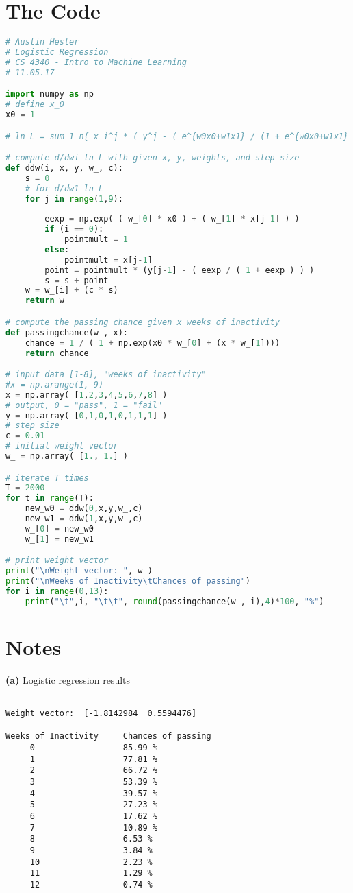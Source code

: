 \documentclass{article}
\begin{document}
\section*{The Code}
\lstset{
	frame=tb,
	tabsize=4,
	showstringspaces=false
}
\begin{lstlisting}[language=Python,breaklines=true]
# Austin Hester
# Logistic Regression
# CS 4340 - Intro to Machine Learning
# 11.05.17

import numpy as np
# define x_0
x0 = 1

# ln L = sum_1_n{ x_i^j * ( y^j - ( e^{w0x0+w1x1} / (1 + e^{w0x0+w1x1} )))}

# compute d/dwi ln L with given x, y, weights, and step size
def ddw(i, x, y, w_, c):
    s = 0
    # for d/dw1 ln L
    for j in range(1,9):
        
        eexp = np.exp( ( w_[0] * x0 ) + ( w_[1] * x[j-1] ) ) 
        if (i == 0):
            pointmult = 1
        else:
            pointmult = x[j-1]
        point = pointmult * (y[j-1] - ( eexp / ( 1 + eexp ) ) ) 
        s = s + point
    w = w_[i] + (c * s)
    return w

# compute the passing chance given x weeks of inactivity
def passingchance(w_, x):
    chance = 1 / ( 1 + np.exp(x0 * w_[0] + (x * w_[1])))
    return chance

# input data [1-8], "weeks of inactivity"
#x = np.arange(1, 9)
x = np.array( [1,2,3,4,5,6,7,8] )
# output, 0 = "pass", 1 = "fail"
y = np.array( [0,1,0,1,0,1,1,1] )
# step size
c = 0.01
# initial weight vector
w_ = np.array( [1., 1.] )

# iterate T times
T = 2000
for t in range(T):
    new_w0 = ddw(0,x,y,w_,c)
    new_w1 = ddw(1,x,y,w_,c)
    w_[0] = new_w0
    w_[1] = new_w1

# print weight vector
print("\nWeight vector: ", w_)
print("\nWeeks of Inactivity\tChances of passing")
for i in range(0,13):
    print("\t",i, "\t\t", round(passingchance(w_, i),4)*100, "%")

\end{lstlisting}


\section*{Notes}

\textbf{(a)} Logistic regression results 
\begin{lstlisting}[breaklines=true,basicstyle=\small]

Weight vector:  [-1.8142984  0.5594476]

Weeks of Inactivity		Chances of passing
	 0 					85.99 %
	 1 					77.81 %
	 2 		 			66.72 %
	 3 		 			53.39 %
	 4 		 			39.57 %
	 5 		 			27.23 %
	 6 		 			17.62 %
	 7 		 			10.89 %
	 8 		 			6.53 %
	 9 		 			3.84 %
	 10 			 	2.23 %
	 11 		 		1.29 %
	 12 		 		0.74 %
\end{lstlisting}
\end{document}
